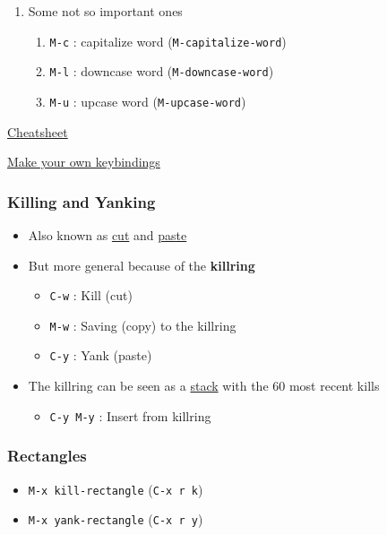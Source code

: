 \documentclass[11pt]{article}
\begin{document}
\begin{enumerate}
\item Some not so important ones
\begin{enumerate}
\item \texttt{M-c} : capitalize word (\texttt{M-capitalize-word})
\item \texttt{M-l} : downcase word   (\texttt{M-downcase-word})
\item \texttt{M-u} : upcase word     (\texttt{M-upcase-word})
\end{enumerate}
\end{enumerate}

\href{https://www.gnu.org/software/emacs/refcards/pdf/refcard.pdf}{Cheatsheet}

\href{https://www.masteringemacs.org/article/mastering-key-bindings-emacs}{Make your own keybindings}

\subsubsection{Killing and Yanking}
\label{sec:org845befd}

\begin{itemize}
\item Also known as \uline{cut} and \uline{paste}

\item But more general because of the \textbf{killring}

\begin{itemize}
\item \texttt{C-w} : Kill   (cut)

\item \texttt{M-w} : Saving (copy) to the killring

\item \texttt{C-y} : Yank   (paste)
\end{itemize}

\item The killring can be seen as a \uline{stack} with the 60 most recent kills

\begin{itemize}
\item \texttt{C-y M-y} : Insert from killring
\end{itemize}
\end{itemize}
\subsubsection{Rectangles}
\label{sec:orgcc37234}

\begin{itemize}
\item \texttt{M-x kill-rectangle} (\texttt{C-x r k})

\item \texttt{M-x yank-rectangle} (\texttt{C-x r y})
\end{itemize}
\end{document}
